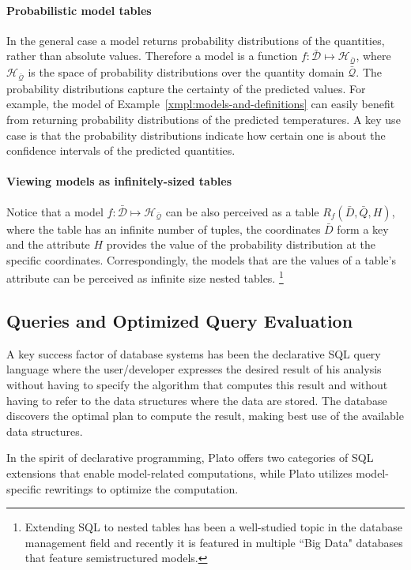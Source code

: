 \paragraph{Probabilistic model tables} In the general case a model returns probability distributions of the quantities, rather than absolute values. Therefore a model is a function $f:\mathcal{\bar{D}}\mapsto \mathcal{H_{\bar{Q}}}$, where $\mathcal{H_{\bar{Q}}}$ is the space of probability distributions over the quantity domain $\mathcal{\bar{Q}}$. The probability distributions capture the certainty of the predicted values.  For example, the model of Example~\ref{xmpl:models-and-definitions} can easily benefit from returning probability distributions of the predicted temperatures. A key use case is that the probability distributions indicate how certain one is about the confidence intervals of the predicted quantities.

\paragraph{Viewing models as infinitely-sized tables} Notice that a model $f:\mathcal{\bar{D}}\mapsto \mathcal{H_{\bar{Q}}}$ can be also perceived as a table $R_f(\bar{D}, \bar{Q}, H)$, where the table has an infinite number of tuples, the coordinates $\bar{D}$ form a key and the attribute $H$ provides the value of the probability distribution at the specific coordinates.
Correspondingly, the models that are the values of a table's attribute can be perceived as infinite size nested tables.%
\footnote{Extending SQL to nested tables has been a well-studied topic in the database management field and recently it is featured in multiple ``Big Data" databases that feature semistructured models. 
}

\subsection{Queries and Optimized Query Evaluation}
\label{sec:queries}
A key success factor of database systems has been the declarative SQL query language where the user/developer expresses the desired result of his analysis without having to specify the algorithm that computes this result and without having to refer to the data structures where the data are stored. The database discovers the optimal plan to compute the result, making best use of the available data structures. 

In the spirit of declarative programming, Plato offers two categories of SQL extensions that enable model-related computations, while Plato utilizes model-specific rewritings to optimize the computation. 

